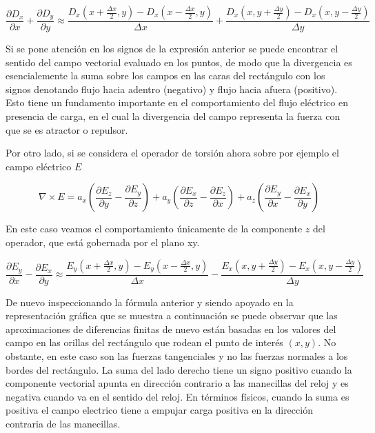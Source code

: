 \documentclass[]{article}
\begin{document}
\begin{equation}
\frac{\partial D_x}{\partial x} + \frac{\partial D_y}{\partial y} \approx \frac{ D_x(x + \frac{\Delta x}{2},y) - D_x(x - \frac{\Delta x}{2},y)}{\Delta x} + \frac{ D_x(x ,y + \frac{\Delta y}{2}) - D_x(x, y- \frac{\Delta y}{2})}{\Delta y}
\end{equation}

Si se pone atención en los signos de la expresión anterior se puede
encontrar el sentido del campo vectorial evaluado en los puntos, de modo
que la divergencia es esencialemente la suma sobre los campos en las
caras del rectángulo con los signos denotando flujo hacia adentro
(negativo) y flujo hacia afuera (positivo). Esto tiene un fundamento
importante en el comportamiento del flujo eléctrico en presencia de
carga, en el cual la divergencia del campo representa la fuerza con que
se es atractor o repulsor.

Por otro lado, si se considera el operador de torsión ahora sobre por
ejemplo el campo eléctrico \(E\)

\begin{equation}
\nabla \times E = a_x (\frac{\partial E_z}{\partial y}  - \frac{\partial E_y}{\partial z}) + a_y(\frac{\partial E_x}{\partial z}  - \frac{\partial E_z}{\partial x}) +a_z(\frac{\partial E_y}{\partial x}  - \frac{\partial E_x}{\partial y}) 
\end{equation}

En este caso veamos el comportamiento únicamente de la componente \(z\)
del operador, que está gobernada por el plano xy.

\begin{equation}
\frac{\partial E_y}{\partial x}  - \frac{\partial E_x}{\partial y} \approx  \frac{ E_y(x + \frac{\Delta x}{2},y) - E_y(x - \frac{\Delta x}{2},y)}{\Delta x} - \frac{ E_x(x ,y + \frac{\Delta y}{2}) - E_x(x, y- \frac{\Delta y}{2})}{\Delta y}
\end{equation}

De nuevo inspeccionando la fórmula anterior y siendo apoyado en la
representación gráfica que se muestra a continuación se puede observar
que las aproximaciones de diferencias finitas de nuevo están basadas en
los valores del campo en las orillas del rectángulo que rodean el punto
de interés \((x,y)\). No obstante, en este caso son las fuerzas
tangenciales y no las fuerzas normales a los bordes del rectángulo. La
suma del lado derecho tiene un signo positivo cuando la componente
vectorial apunta en dirección contrario a las manecillas del reloj y es
negativa cuando va en el sentido del reloj. En términos físicos, cuando
la suma es positiva el campo electrico tiene a empujar carga positiva en
la dirección contraria de las manecillas.
\end{document}
